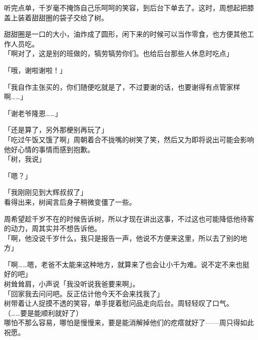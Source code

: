 听完点单，千岁毫不掩饰自己乐呵呵的笑容，到后台下单去了。这时，周想起把膝盖上装着甜甜圈的袋子交给了树。

甜甜圈是一口的大小，油炸成了圆形，闲下来的时候可以当作零食，也方便其他工作人员吃。\\

「啊对了，这是别的班做的，犒劳犒劳你们。也给后台那些人休息时吃点」

「哦，谢啦谢啦！」

「我自作主张买的，你们随便吃就是了，不过要谢的话，也要谢得有点管家样啊……」

「谢老爷隆恩……」

「还是算了，另外那梗别再玩了」\\

「吃过午饭又饿了啊」周朝着合不拢嘴的树笑了笑，然后又为即将说出可能会影响他好心情的事情而感到抱歉。\\

「树，我说」

「嗯？」

「我刚刚见到大辉叔叔了」\\

看得出来，树闻言后身子稍微变僵了一些。

周希望趁千岁不在的时候告诉树，所以才现在讲出这事，不过这也可能降低他待客的动力，周其实并不想告诉他。\\

「啊，他没说千岁什么，我只是报告一声，他说不方便来这里，所以去了别的地方」

「啊……嗯，老爸不太能来这种地方，就算来了也会让小千为难。说不定不来也挺好的吧」\\

树耸耸肩，小声说「我没听说我爸要来啊」。\\

「回家我去问问吧。反正估计他今天不会来找我了」\\

树带着让人捉摸不透的笑容，单手提着慰问品走向后台。周轻轻叹了口气。\\

（……要是能顺利就好了）\\

哪怕不那么容易，哪怕是慢慢来，要是能消解掉他们的疙瘩就好了——周只得如此祝愿。
